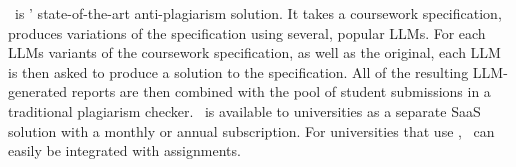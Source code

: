 \higherEdAntiCheat\ is \higherEdShortName' state-of-the-art anti-plagiarism solution. It takes a coursework specification, produces variations of the specification using several, popular LLMs. For each LLMs variants of the coursework specification, as well as the original, each LLM is then asked to produce a solution to the specification. All of the resulting LLM-generated reports are then combined with the pool of student submissions in a traditional plagiarism checker. \higherEdAntiCheat\ is available to universities as a separate SaaS solution with a monthly or annual subscription. For universities that use \higherEdCSRS, \higherEdAntiCheat\ can easily be integrated with assignments.

